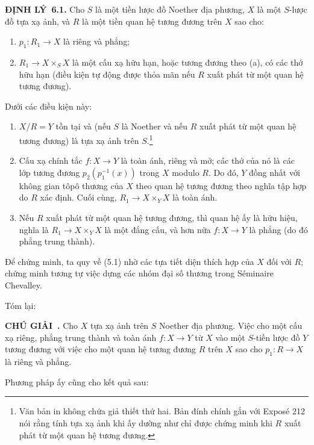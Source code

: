 \documentclass[11pt,twoside,openany]{book}
\numberwithin{equation}{section}
\newcommand{\src}[1]{%
  \phantomsection\hypertarget{src:\fgasourceid:#1}{}%
  \marginpar{\raggedleft\footnotesize\sffamily #1}%
}
\newcommand{\fgasourceid}{unset}
\newcommand{\result}[2]{\par\medskip\noindent\textbf{#1\if\relax\detokenize{#2}\relax\else\ #2\fi.}\quad}
\begin{document}
\result{ĐỊNH LÝ}{6.1} Cho $S$ là một tiền lược đồ Noether địa phương, $X$ là
một $S$-lược đồ tựa xạ ảnh, và $R$ là một tiền quan hệ tương đương trên $X$
sao cho:
\src{113}
\begin{enumerate}
\item[(a)] $p_1:R_1\to X$ là riêng và phẳng;
\item[(b)] $R_1\to X\times_S X$ là một cấu xạ hữu hạn, hoặc tương đương theo
(a), có các thớ hữu hạn (điều kiện tự động được thỏa mãn nếu $R$ xuất phát từ
một quan hệ tương đương).
\end{enumerate}
Dưới các điều kiện này:
\begin{enumerate}
\item[(i)] $X/R=Y$ tồn tại và (nếu $S$ là Noether và nếu $R$ xuất phát từ một
quan hệ tương đương) là tựa xạ ảnh trên $S$.\footnote{Văn bản in không chứa
giả thiết thứ hai. Bản đính chính gắn với
Exposé 212 nói rằng tính tựa xạ ảnh khi ấy dường như chỉ được chứng minh khi
$R$ xuất phát từ một quan hệ tương đương.}

\item[(ii)] Cấu xạ chính tắc $f:X\to Y$ là toàn ánh, riêng và mở; các thớ của
nó là các lớp tương đương $p_2(p_1^{-1}(x))$ trong $X$ modulo $R$. Do đó,
$Y$ đồng nhất với không gian tôpô thương của $X$ theo quan hệ tương đương theo
nghĩa tập hợp do $R$ xác định. Cuối cùng,
$R_1\to X\times_Y X$ là toàn ánh.

\item[(iii)] Nếu $R$ xuất phát từ một quan hệ tương đương, thì quan hệ ấy là
hữu hiệu, nghĩa là $R_1\to X\times_Y X$ là một đẳng cấu, và hơn nữa
$f:X\to Y$ là phẳng (do đó phẳng trung thành).
\end{enumerate}

Để chứng minh, ta quy về (5.1) nhờ các tựa tiết diện thích hợp của $X$ đối với
$R$; chứng minh tương tự việc dựng các nhóm đại số thương trong Séminaire
Chevalley.

Tóm lại:

\result{CHÚ GIẢI}{} Cho $X$ tựa xạ ảnh trên $S$ Noether địa phương. Việc cho
một cấu xạ riêng, phẳng trung thành và toàn ánh $f:X\to Y$ từ $X$ vào một
$S$-tiền lược đồ $Y$ tương đương với việc cho một quan hệ tương đương $R$ trên
$X$ sao cho $p_1:R\to X$ là riêng và phẳng.

Phương pháp ấy cũng cho kết quả sau:
\end{document}
